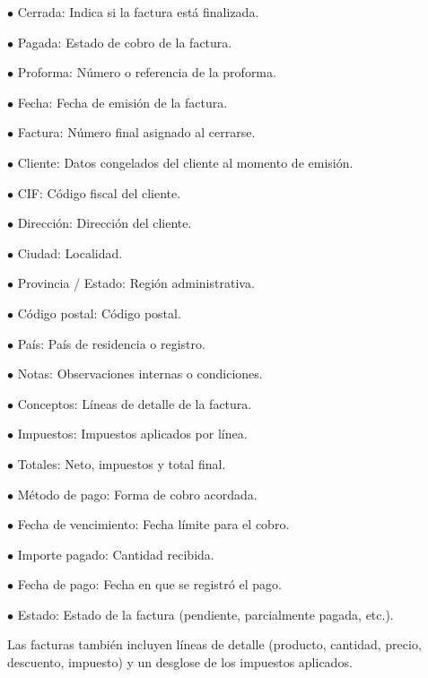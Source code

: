 \documentclass[a4paper]{article}
\begin{document}
\begin{compactitem}
\item[\color{myblue}$\bullet$] Cerrada: Indica si la factura está finalizada.
\item[\color{myblue}$\bullet$] Pagada: Estado de cobro de la factura.
\item[\color{myblue}$\bullet$] Proforma: Número o referencia de la proforma.
\item[\color{myblue}$\bullet$] Fecha: Fecha de emisión de la factura.
\item[\color{myblue}$\bullet$] Factura: Número final asignado al cerrarse.
\item[\color{myblue}$\bullet$] Cliente: Datos congelados del cliente al momento de emisión.
\item[\color{myblue}$\bullet$] CIF: Código fiscal del cliente.
\item[\color{myblue}$\bullet$] Dirección: Dirección del cliente.
\item[\color{myblue}$\bullet$] Ciudad: Localidad.
\item[\color{myblue}$\bullet$] Provincia / Estado: Región administrativa.
\item[\color{myblue}$\bullet$] Código postal: Código postal.
\item[\color{myblue}$\bullet$] País: País de residencia o registro.
\item[\color{myblue}$\bullet$] Notas: Observaciones internas o condiciones.
\item[\color{myblue}$\bullet$] Conceptos: Líneas de detalle de la factura.
\item[\color{myblue}$\bullet$] Impuestos: Impuestos aplicados por línea.
\item[\color{myblue}$\bullet$] Totales: Neto, impuestos y total final.
\item[\color{myblue}$\bullet$] Método de pago: Forma de cobro acordada.
\item[\color{myblue}$\bullet$] Fecha de vencimiento: Fecha límite para el cobro.
\item[\color{myblue}$\bullet$] Importe pagado: Cantidad recibida.
\item[\color{myblue}$\bullet$] Fecha de pago: Fecha en que se registró el pago.
\item[\color{myblue}$\bullet$] Estado: Estado de la factura (pendiente, parcialmente pagada, etc.).
\end{compactitem}

Las facturas también incluyen líneas de detalle (producto, cantidad, precio, descuento, impuesto) y un desglose de los impuestos aplicados.
\end{document}
